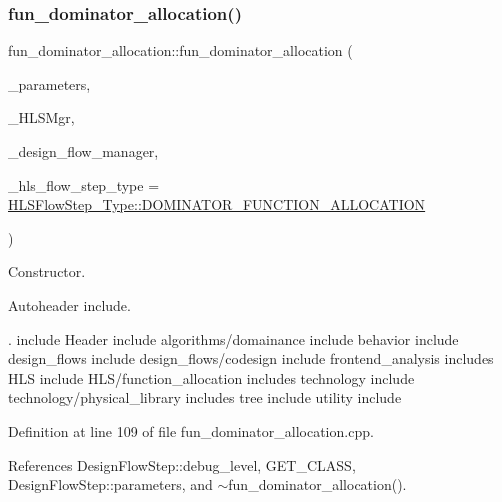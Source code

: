 \subsubsection{\texorpdfstring{fun\+\_\+dominator\+\_\+allocation()}{fun\_dominator\_allocation()}}
{\footnotesize\ttfamily fun\+\_\+dominator\+\_\+allocation\+::fun\+\_\+dominator\+\_\+allocation (\begin{DoxyParamCaption}\item[{const \hyperlink{Parameter_8hpp_a37841774a6fcb479b597fdf8955eb4ea}{Parameter\+Const\+Ref}}]{\+\_\+parameters,  }\item[{const \hyperlink{hls__manager_8hpp_acd3842b8589fe52c08fc0b2fcc813bfe}{H\+L\+S\+\_\+manager\+Ref}}]{\+\_\+\+H\+L\+S\+Mgr,  }\item[{const Design\+Flow\+Manager\+Const\+Ref}]{\+\_\+design\+\_\+flow\+\_\+manager,  }\item[{const \hyperlink{hls__step_8hpp_ada16bc22905016180e26fc7e39537f8d}{H\+L\+S\+Flow\+Step\+\_\+\+Type}}]{\+\_\+hls\+\_\+flow\+\_\+step\+\_\+type = {\ttfamily \hyperlink{hls__step_8hpp_ada16bc22905016180e26fc7e39537f8da7ef76b1892af42231678f55ee395585e}{H\+L\+S\+Flow\+Step\+\_\+\+Type\+::\+D\+O\+M\+I\+N\+A\+T\+O\+R\+\_\+\+F\+U\+N\+C\+T\+I\+O\+N\+\_\+\+A\+L\+L\+O\+C\+A\+T\+I\+ON}} }\end{DoxyParamCaption})}



Constructor. 

Autoheader include.

. include Header include algorithms/domainance include behavior include design\+\_\+flows include design\+\_\+flows/codesign include frontend\+\_\+analysis includes H\+LS include H\+L\+S/function\+\_\+allocation includes technology include technology/physical\+\_\+library includes tree include utility include 

Definition at line 109 of file fun\+\_\+dominator\+\_\+allocation.\+cpp.



References Design\+Flow\+Step\+::debug\+\_\+level, G\+E\+T\+\_\+\+C\+L\+A\+SS, Design\+Flow\+Step\+::parameters, and $\sim$fun\+\_\+dominator\+\_\+allocation().

